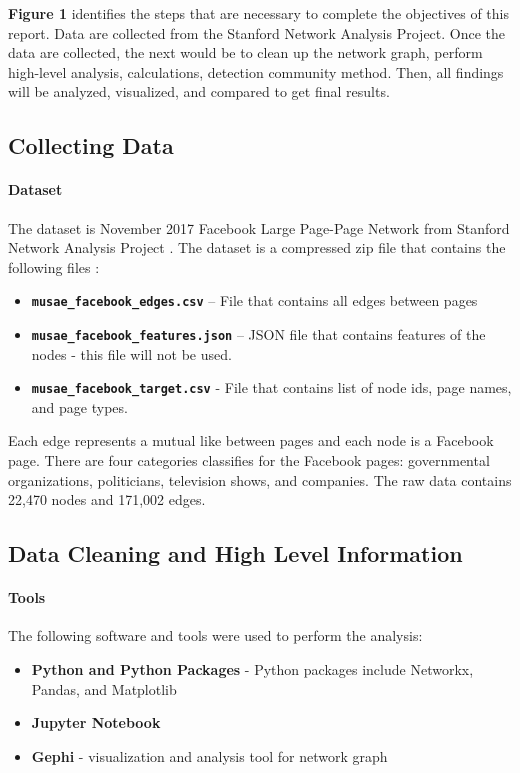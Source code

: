 \documentclass[11pt,twocolumn]{article}
\begin{document}
\textbf{Figure 1} identifies the steps that are necessary to complete the objectives of this report. Data are collected from the Stanford Network Analysis Project. Once the data are collected, the next would be to clean up the network graph, perform high-level analysis, calculations, detection community method. Then, all findings will be analyzed, visualized, and compared to get final results.

\subsection{Collecting Data}

\paragraph{Dataset \cite{page-page-network-ds}}
The dataset is November 2017 Facebook Large Page-Page Network from Stanford Network Analysis Project \cite{page-page-network-ds}. The dataset is a compressed zip file that contains the following files :
\begin{itemize}
\item\textbf{\texttt{musae\_facebook\_edges.csv}} – File that contains all edges between pages
\item\textbf{\texttt{musae\_facebook\_features.json}} – JSON file that contains features of the nodes - this file will not be used.
\item\textbf{\texttt{musae\_facebook\_target.csv}} - File that contains list of node ids, page names, and page types.
\end{itemize}

Each edge represents a mutual like between pages and each node is a Facebook page. There are four categories classifies for the Facebook pages: governmental organizations, politicians, television shows, and companies. The raw data contains 22,470 nodes and 171,002 edges.

\subsection{Data Cleaning and High Level Information}

\paragraph{Tools}
The following software and tools were used to perform the analysis:
\begin{itemize}
\item \textbf{Python and Python Packages} - Python packages include Networkx, Pandas, and Matplotlib
\item \textbf{Jupyter Notebook}
\item \textbf{Gephi} - visualization and analysis tool for network graph
\end{itemize}
\end{document}
